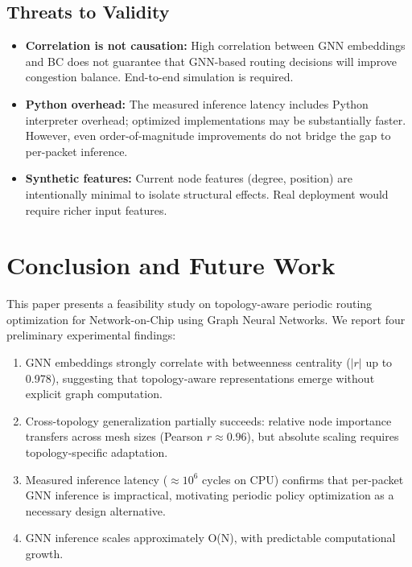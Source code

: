 \documentclass[conference]{IEEEtran}
\begin{document}
\subsection{Threats to Validity}

\begin{itemize}
    \item \textbf{Correlation is not causation:} High correlation between GNN embeddings and BC does not guarantee that GNN-based routing decisions will improve congestion balance. End-to-end simulation is required.
    \item \textbf{Python overhead:} The measured inference latency includes Python interpreter overhead; optimized implementations may be substantially faster. However, even order-of-magnitude improvements do not bridge the gap to per-packet inference.
    \item \textbf{Synthetic features:} Current node features (degree, position) are intentionally minimal to isolate structural effects. Real deployment would require richer input features.
\end{itemize}

\section{Conclusion and Future Work}
\label{sec:conclusion}

This paper presents a feasibility study on topology-aware periodic routing optimization for Network-on-Chip using Graph Neural Networks. We report four preliminary experimental findings:

\begin{enumerate}
    \item GNN embeddings strongly correlate with betweenness centrality ($|r|$ up to 0.978), suggesting that topology-aware representations emerge without explicit graph computation.
    \item Cross-topology generalization partially succeeds: relative node importance transfers across mesh sizes (Pearson $r \approx 0.96$), but absolute scaling requires topology-specific adaptation.
    \item Measured inference latency ($\approx 10^6$ cycles on CPU) confirms that per-packet GNN inference is impractical, motivating periodic policy optimization as a necessary design alternative.
    \item GNN inference scales approximately O(N), with predictable computational growth.
\end{enumerate}
\end{document}
